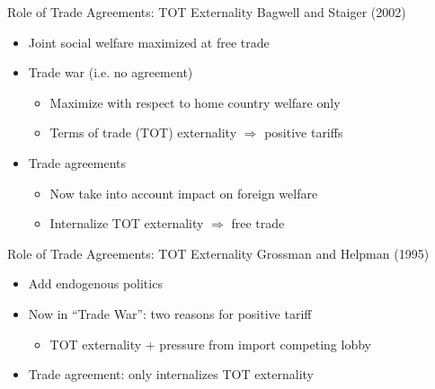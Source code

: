 \documentclass[handout]{beamer}
\begin{document}
\begin{frame}{Role of Trade Agreements: TOT Externality}
\pause
Bagwell and Staiger (2002)
\pause
\begin{itemize}[<+->]
	\item Joint social welfare maximized at free trade
	\item Trade war (i.e. no agreement)
		\begin{itemize}
			\item Maximize with respect to home country welfare only
			\item Terms of trade (TOT) externality $\Rightarrow$ positive tariffs  
		\end{itemize}
	\item Trade agreements
    \begin{itemize}
			\item Now take into account impact on foreign welfare
			\item Internalize TOT externality $\Rightarrow$ free trade
    \end{itemize}
\end{itemize}
\end{frame} 

 
\begin{frame}{Role of Trade Agreements: TOT Externality}
\pause
Grossman and Helpman (1995)
\pause
\begin{itemize}[<+->]
	\item Add endogenous politics
	\item Now in ``Trade War'': two reasons for positive tariff
		\begin{itemize}
			\item TOT externality + pressure from import competing lobby
		\end{itemize}
	
	\item Trade agreement: only internalizes TOT externality
\end{itemize}
\end{frame} 

\end{document}
